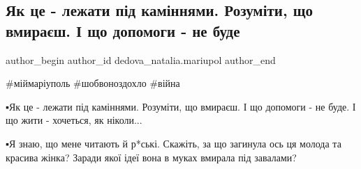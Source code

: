  
 
 
 
 

\subsection{Як це - лежати під каміннями. Розуміти, що вмираєш. І що допомоги - не буде}
\label{sec:11_01_2023.fb.dedova_natalia.mariupol.1.yak_tse___lezhati_p_}

\ifcmt
 author_begin
   author_id dedova_natalia.mariupol
 author_end
\fi

\#міймаріуполь
\#шобвоноздохло
\#війна

▪️Як це - лежати під каміннями. Розуміти, що вмираєш. І що допомоги - не буде. І що жити - хочеться, як ніколи...

▪️Я знаю, що мене читають й р*ські. Скажіть, за що загинула ось ця молода та
красива жінка? Заради якої ідеї вона в муках вмирала під завалами?
